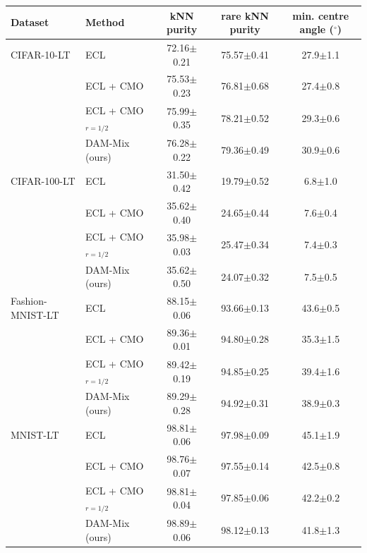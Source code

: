 \begin{tabular}{ll ccc}
\toprule
Dataset & Method & kNN purity & rare kNN purity & min. centre angle ($^\circ$) \\
\midrule
CIFAR-10-LT & ECL & 72.16{\scriptsize$\pm$0.21} & 75.57{\scriptsize$\pm$0.41} & 27.9{\scriptsize$\pm$1.1} \\
 & ECL + CMO & 75.53{\scriptsize$\pm$0.23} & 76.81{\scriptsize$\pm$0.68} & 27.4{\scriptsize$\pm$0.8} \\
 & ECL + CMO$_{r=1/2}$ & 75.99{\scriptsize$\pm$0.35} & 78.21{\scriptsize$\pm$0.52} & 29.3{\scriptsize$\pm$0.6} \\
 & DAM-Mix (ours) & 76.28{\scriptsize$\pm$0.22} & 79.36{\scriptsize$\pm$0.49} & 30.9{\scriptsize$\pm$0.6} \\
\addlinespace
CIFAR-100-LT & ECL & 31.50{\scriptsize$\pm$0.42} & 19.79{\scriptsize$\pm$0.52} & 6.8{\scriptsize$\pm$1.0} \\
 & ECL + CMO & 35.62{\scriptsize$\pm$0.40} & 24.65{\scriptsize$\pm$0.44} & 7.6{\scriptsize$\pm$0.4} \\
 & ECL + CMO$_{r=1/2}$ & 35.98{\scriptsize$\pm$0.03} & 25.47{\scriptsize$\pm$0.34} & 7.4{\scriptsize$\pm$0.3} \\
 & DAM-Mix (ours) & 35.62{\scriptsize$\pm$0.50} & 24.07{\scriptsize$\pm$0.32} & 7.5{\scriptsize$\pm$0.5} \\
\addlinespace
Fashion-MNIST-LT & ECL & 88.15{\scriptsize$\pm$0.06} & 93.66{\scriptsize$\pm$0.13} & 43.6{\scriptsize$\pm$0.5} \\
 & ECL + CMO & 89.36{\scriptsize$\pm$0.01} & 94.80{\scriptsize$\pm$0.28} & 35.3{\scriptsize$\pm$1.5} \\
 & ECL + CMO$_{r=1/2}$ & 89.42{\scriptsize$\pm$0.19} & 94.85{\scriptsize$\pm$0.25} & 39.4{\scriptsize$\pm$1.6} \\
 & DAM-Mix (ours) & 89.29{\scriptsize$\pm$0.28} & 94.92{\scriptsize$\pm$0.31} & 38.9{\scriptsize$\pm$0.3} \\
\addlinespace
MNIST-LT & ECL & 98.81{\scriptsize$\pm$0.06} & 97.98{\scriptsize$\pm$0.09} & 45.1{\scriptsize$\pm$1.9} \\
 & ECL + CMO & 98.76{\scriptsize$\pm$0.07} & 97.55{\scriptsize$\pm$0.14} & 42.5{\scriptsize$\pm$0.8} \\
 & ECL + CMO$_{r=1/2}$ & 98.81{\scriptsize$\pm$0.04} & 97.85{\scriptsize$\pm$0.06} & 42.2{\scriptsize$\pm$0.2} \\
 & DAM-Mix (ours) & 98.89{\scriptsize$\pm$0.06} & 98.12{\scriptsize$\pm$0.13} & 41.8{\scriptsize$\pm$1.3} \\
\bottomrule
\end{tabular}
